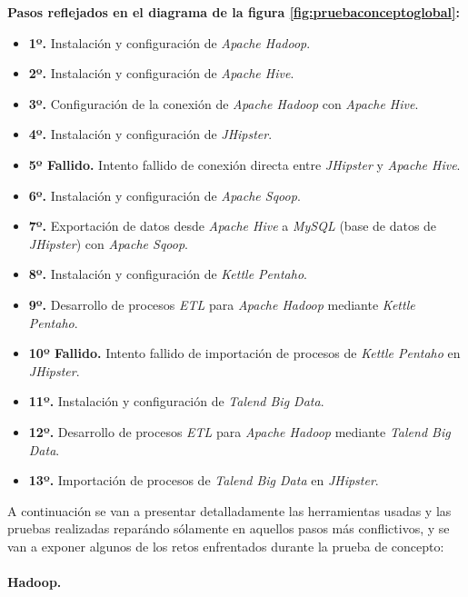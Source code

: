 \par

\textbf{Pasos reflejados en el diagrama de la figura \ref{fig:pruebaconceptoglobal}:}
\begin{itemize}
\item \textbf{1º.} Instalación y configuración de \textit{Apache Hadoop}.
\item \textbf{2º.} Instalación y configuración de \textit{Apache Hive}.
\item \textbf{3º.} Configuración de la conexión de \textit{Apache Hadoop} con \textit{Apache Hive}.
\item \textbf{4º.} Instalación y configuración de \textit{JHipster}.
\item \textbf{5º Fallido.} Intento fallido de conexión directa entre \textit{JHipster} y \textit{Apache Hive}.
\item \textbf{6º.} Instalación y configuración de \textit{Apache Sqoop}. 
\item \textbf{7º.} Exportación de datos desde \textit{Apache Hive} a \textit{MySQL} (base de datos de \textit{JHipster}) con \textit{Apache Sqoop}.
\item \textbf{8º.} Instalación y configuración de \textit{Kettle Pentaho}.
\item \textbf{9º.} Desarrollo de procesos \textit{ETL} para \textit{Apache Hadoop} mediante \textit{Kettle Pentaho}.
\item \textbf{10º Fallido.} Intento fallido de importación de procesos de \textit{Kettle Pentaho} en \textit{JHipster}.
\item \textbf{11º.} Instalación y configuración de\textit{ Talend Big Data}.
\item \textbf{12º.} Desarrollo de procesos \textit{ETL} para \textit{Apache Hadoop }mediante \textit{Talend Big Data}.
\item \textbf{13º.} Importación de procesos de \textit{Talend Big Data} en \textit{JHipster}.
\end{itemize}

A continuación se van a presentar detalladamente las herramientas usadas y las pruebas realizadas reparándo sólamente en aquellos pasos más conflictivos, y se van a exponer algunos de los retos enfrentados durante la prueba de concepto: 
\bigskip
\par
\paragraph*{Hadoop.}

